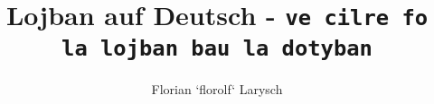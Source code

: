 \title{Lojban auf Deutsch - \tt{ve cilre fo la lojban bau la dotyban}\rm{}}
\author{Florian `florolf` Larysch}

\maketitle

\tableofcontents
